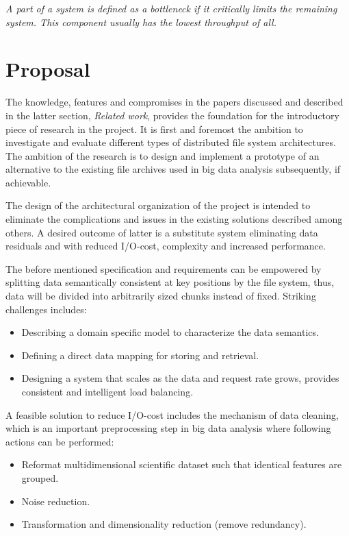 \begin{definition} \label{def:bottle}
\textit{A part of a system is defined as a bottleneck if it critically limits the remaining system. This component usually has the lowest throughput of all.}
\end{definition}
\vspace*{3mm}

\section{Proposal} \label{sec:proposal}
The knowledge, features and compromises in the papers discussed and described in the latter section, \textit{Related work}, provides the foundation for the introductory piece of research in the project. It is first and foremost the ambition to investigate and evaluate different types of distributed file system architectures. The ambition of the research is to design and implement a prototype of an alternative to the existing file archives used in big data analysis subsequently, if achievable.
\newpage

The design of the architectural organization of the project is intended to eliminate the complications and issues in the existing solutions described among others. A desired outcome of latter is a substitute system eliminating data residuals and with reduced I/O-cost, complexity and increased performance.
\newline

The before mentioned specification and requirements can be empowered by splitting data semantically consistent at key positions by the file system, thus, data will be divided into arbitrarily sized chunks instead of fixed. Striking challenges includes:
\vspace*{5mm}
\begin{itemize}
	\item Describing a domain specific model to characterize the data semantics.
	\item Defining a direct data mapping for storing and retrieval.
	\item Designing a system that scales as the data and request rate grows, \ie provides consistent and intelligent load balancing.
\end{itemize}
\vspace*{5mm}

A feasible solution to reduce I/O-cost includes the mechanism of data cleaning, which is an important preprocessing step in big data analysis where \ie following actions can be performed:
\vspace*{5mm}
\begin{itemize}
	\item Reformat multidimensional scientific dataset such that identical features are grouped.
	\item Noise reduction.
	\item Transformation and dimensionality reduction (remove redundancy).
\end{itemize}
\vspace*{5mm}

